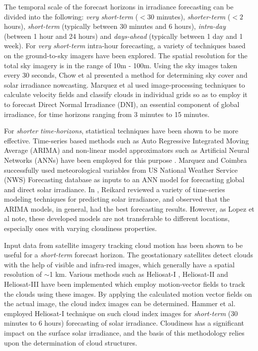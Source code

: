 \par The temporal scale of the forecast horizons in irradiance forecasting can be divided into the following: \textit{very short-term} ($<30$ minutes), \textit{shorter-term} ($<2$ hours), \textit{short-term} (typically between 30 minutes and 6 hours), \textit{intra-day} (between 1 hour and 24 hours) and \textit{days-ahead} (typically between 1 day and 1 week). For \textit{very short-term} intra-hour forecasting, a variety of techniques based on the ground-to-sky imagers have been explored. The spatial resolution for the total sky imagery is in the range of 10m - 100m. Using the sky images taken every 30 seconds, Chow et al \cite{litrev_intrahour1} presented a method for determining sky cover and solar irradiance nowcasting. Marquez et al \cite{litrev_intrahour2} used image-processing techniques to calculate velocity fields and classify clouds in individual grids so as to employ it to forecast Direct Normal Irradiance (DNI), an essential component of global irradiance, for time horizons ranging from 3 minutes to 15 minutes.

\par For \textit{shorter time-horizons}, statistical techniques have been shown to be more effective. Time-series based methods such as Auto Regressive Integrated Moving Average (ARIMA) and non-linear model approximators such as Artificial Neural Networks (ANNs) have been employed for this purpose \cite{litrev_ts1}. Marquez and Coimbra \cite{litrev_ts2} successfully used meteorological variables from US National Weather Service (NWS) Forecasting database as inputs to an ANN model for forecasting global and direct solar irradiance. In \cite{litrev_ts3}, Reikard reviewed a variety of time-series modeling techniques for predicting solar irradiance, and observed that the ARIMA models, in general, had the best forecasting results. However, as Lopez et al \cite{litrev_ts4} note, these developed models are not transferable to different locations, especially ones with varying cloudiness properties. 

\par Input data from satellite imagery tracking cloud motion has been shown to be useful for a \textit{short-term} forecast horizon. The geostationary satellites detect clouds with the help of visible and infra-red images, which generally have a spatial resolution of $\sim$1 km. Various methods such as Heliosat-I \cite{litrev_sat1}, Heliosat-II \cite{litrev_sat2} and Heliosat-III \cite{litrev_sat3} have been implemented which employ motion-vector fields to track the clouds using these images. By applying the calculated motion vector fields on the actual image, the cloud index images can be determined. Hammer et al. \cite{litrev_sat4} employed Heliosat-I technique on such cloud index images for \textit{short-term} (30 minutes to 6 hours) forecasting of solar irradiance. Cloudiness has a significant impact on the surface solar irradiance, and the basis of this methodology relies upon the determination of cloud structures.

